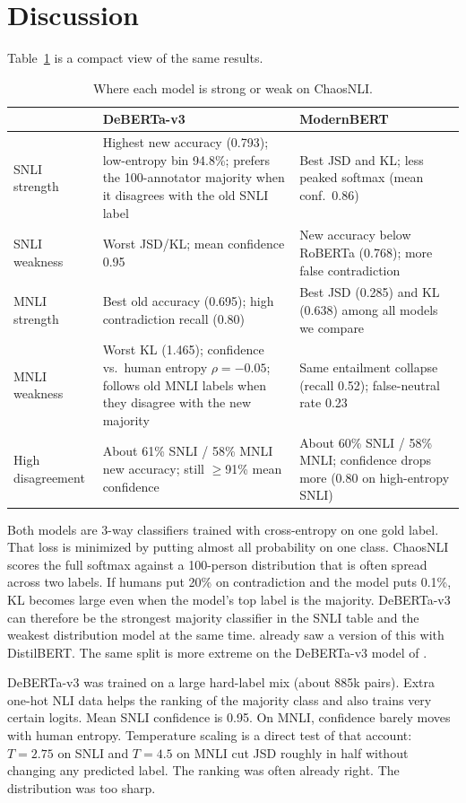 \documentclass[11pt,a4paper]{article}
\begin{document}
\section{Discussion}

Table~\ref{tab:strengths} is a compact view of the same results.

\begin{table}[H]
\centering
\small
\caption{Where each model is strong or weak on ChaosNLI.}
\label{tab:strengths}
\begin{tabular}{p{2.4cm}p{5.4cm}p{5.4cm}}
\toprule
 & DeBERTa-v3 & ModernBERT \\
\midrule
SNLI strength & Highest new accuracy (0.793); low-entropy bin 94.8\%; prefers the 100-annotator majority when it disagrees with the old SNLI label & Best JSD and KL; less peaked softmax (mean conf.\ 0.86) \\
SNLI weakness & Worst JSD/KL; mean confidence 0.95 & New accuracy below RoBERTa (0.768); more false contradiction \\
MNLI strength & Best old accuracy (0.695); high contradiction recall (0.80) & Best JSD (0.285) and KL (0.638) among all models we compare \\
MNLI weakness & Worst KL (1.465); confidence vs.\ human entropy $\rho=-0.05$; follows old MNLI labels when they disagree with the new majority & Same entailment collapse (recall 0.52); false-neutral rate 0.23 \\
High disagreement & About 61\% SNLI / 58\% MNLI new accuracy; still $\ge$91\% mean confidence & About 60\% SNLI / 58\% MNLI; confidence drops more (0.80 on high-entropy SNLI) \\
\bottomrule
\end{tabular}
\end{table}

Both models are 3-way classifiers trained with cross-entropy on one gold label. That loss is minimized by putting almost all probability on one class. ChaosNLI scores the full softmax against a 100-person distribution that is often spread across two labels. If humans put 20\% on contradiction and the model puts 0.1\%, KL becomes large even when the model's top label is the majority. DeBERTa-v3 can therefore be the strongest majority classifier in the SNLI table and the weakest distribution model at the same time. \citet{nie2020chaosnli} already saw a version of this with DistilBERT. The same split is more extreme on the DeBERTa-v3 model of \citet{laurer2024less}.

DeBERTa-v3 was trained on a large hard-label mix (about 885k pairs). Extra one-hot NLI data helps the ranking of the majority class and also trains very certain logits. Mean SNLI confidence is 0.95. On MNLI, confidence barely moves with human entropy. Temperature scaling is a direct test of that account: $T=2.75$ on SNLI and $T=4.5$ on MNLI cut JSD roughly in half without changing any predicted label. The ranking was often already right. The distribution was too sharp.
\end{document}
